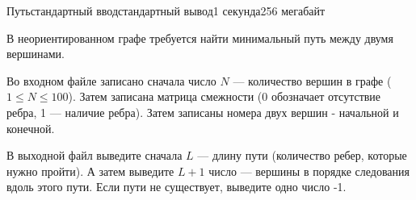 \begin{problem}{Путь}{стандартный ввод}{стандартный вывод}{1 секунда}{256 мегабайт}

В неориентированном графе требуется найти минимальный путь между двумя вершинами.

\InputFile
Во входном файле записано сначала число $N$ --- количество вершин в графе ($1 \le N \le 100$). Затем записана матрица смежности (0 обозначает отсутствие ребра, 1 --- наличие ребра). Затем записаны номера двух вершин - начальной и конечной. 

\OutputFile
В выходной файл выведите сначала $L$ --- длину пути (количество ребер, которые нужно пройти). А затем выведите $L + 1$ число --- вершины в порядке следования вдоль этого пути. 
Если пути не существует, выведите одно число -1.

\Example

\begin{example}
%
\end{example}

\end{problem}

